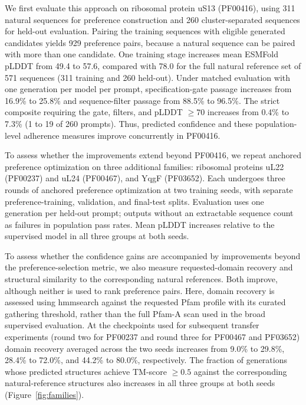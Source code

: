 \documentclass{article} %
\newcommand{\pct}{\%}
\begin{document}
We first evaluate this approach on ribosomal protein uS13 (PF00416), using 311 natural sequences for preference construction and 260 cluster-separated sequences for held-out evaluation. Pairing the training sequences with eligible generated candidates yields 929 preference pairs, because a natural sequence can be paired with more than one candidate. One training stage increases mean ESMFold pLDDT from 49.4 to 57.6, compared with 78.0 for the full natural reference set of 571 sequences (311 training and 260 held-out). Under matched evaluation with one generation per model per prompt, specification-gate passage increases from 16.9\pct{} to 25.8\pct{} and sequence-filter passage from 88.5\pct{} to 96.5\pct{}. The strict composite requiring the gate, filters, and pLDDT $\geq70$ increases from 0.4\pct{} to 7.3\pct{}
(1 to 19 of 260 prompts). Thus, predicted confidence and these population-level adherence measures improve concurrently in PF00416.

To assess whether the improvements extend beyond PF00416, we repeat anchored preference optimization on three additional families: ribosomal proteins uL22 (PF00237) and uL24 (PF00467), and YqgF (PF03652). Each undergoes three rounds of anchored preference
optimization at two training seeds, with separate preference-training, validation, and final-test splits. Evaluation uses one generation per held-out prompt; outputs without an extractable sequence count as
failures in population pass rates. Mean pLDDT increases relative to the supervised model in all three groups at both seeds.

To assess whether the confidence gains are accompanied by improvements beyond the preference-selection metric, we also measure requested-domain recovery and structural similarity to the corresponding natural references. Both improve, although neither is used to rank preference pairs. Here,
domain recovery is assessed using hmmsearch against the requested
Pfam profile with its curated gathering threshold, rather than the
full Pfam-A scan used in the broad supervised evaluation. At the
checkpoints used for subsequent transfer experiments (round two for
PF00237 and round three for PF00467 and PF03652) domain recovery averaged across the two seeds increases from 9.0\pct{} to 29.8\pct{}, 28.4\pct{} to 72.0\pct{}, and 44.2\pct{} to 80.0\pct{}, respectively. The fraction of generations whose predicted structures achieve TM-score $\geq0.5$ against the corresponding natural-reference
structures also increases in all three groups at both seeds (Figure~\ref{fig:families}).
\end{document}
